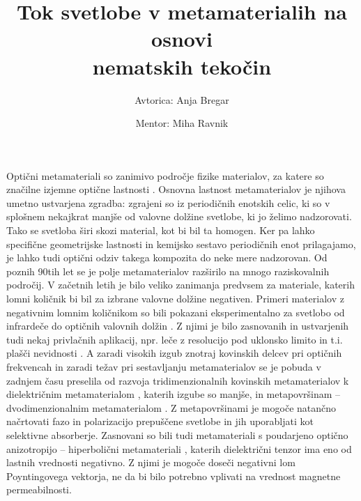 \documentclass[a4paper,11pt]{article}
\title{\huge{Tok svetlobe v metamaterialih na osnovi \\nematskih tekočin}}
\author{Avtorica: Anja Bregar \and Mentor: Miha Ravnik}
\begin{document}
\setcounter{page}{5}

\onehalfspacing

\maketitle



Optični metamateriali so zanimivo področje fizike materialov, za katere so značilne izjemne optične lastnosti \cite{wegener-2011-nature-review}.
Osnovna lastnost metamaterialov je njihova umetno ustvarjena zgradba: zgrajeni so iz periodičnih enotskih celic, ki so v splošnem nekajkrat manjše od valovne dolžine svetlobe, ki jo želimo nadzorovati.
Tako se svetloba širi skozi material, kot bi bil ta homogen. 
Ker pa lahko specifične geometrijske lastnosti in kemijsko sestavo periodičnih enot prilagajamo, je lahko tudi optični odziv takega kompozita do neke mere nadzorovan.
Od poznih 90tih let se je polje metamaterialov razširilo na mnogo raziskovalnih področij. 
V začetnih letih je bilo veliko zanimanja predvsem za materiale, katerih lomni količnik bi bil za izbrane valovne dolžine negativen. 
Primeri materialov z negativnim lomnim količnikom so bili pokazani eksperimentalno za svetlobo od infrardeče do optičnih valovnih dolžin \cite{schultz-2000-first-mtm,zhang-2008-fishnet}. 
Z njimi je bilo zasnovanih in ustvarjenih tudi nekaj privlačnih aplikacij, npr. leče z resolucijo pod uklonsko limito \cite{capasso-2016-metalens} in t.i. plašči nevidnosti \cite{zhang-2015-skin-cloak}. 
A zaradi visokih izgub znotraj kovinskih delcev pri optičnih frekvencah in zaradi težav pri sestavljanju metamaterialov se je pobuda v zadnjem času preselila od razvoja tridimenzionalnih kovinskih metamaterialov k dielektričnim metamaterialom \cite{jacob-2016-all-dielectric}, katerih izgube so manjše, in metapovršinam -- dvodimenzionalnim metamaterialom \cite{meinzer-2014-metasurface}. 
Z metapovršinami je mogoče natančno načrtovati fazo in polarizacijo prepuščene svetlobe \cite{capasso-2014-flat-optics-metasurface} in jih uporabljati kot selektivne absorberje.
Zasnovani so bili tudi metamateriali s poudarjeno optično anizotropijo -- hiperbolični metamateriali \cite{kivshar-2013-hyperbolic}, katerih dielektrični tenzor ima eno od lastnih vrednosti negativno. 
Z njimi je mogoče doseči negativni lom Poyntingovega vektorja, ne da bi bilo potrebno vplivati na vrednost magnetne permeabilnosti.


\end{document}
